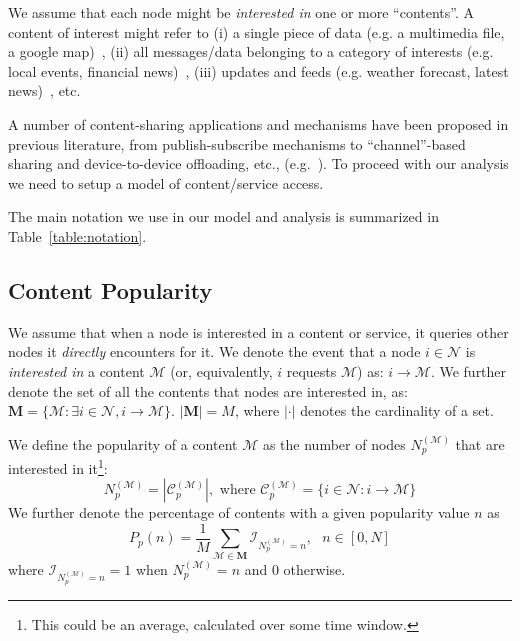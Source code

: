 \documentclass[journal]{IEEEtran}
\newcommand{\Np}{N_{p}^{(\mathcal{M})}}
\begin{document}
We assume that each node might be \textit{interested in} one or more ``contents''. A content of interest might refer to  (i) a single piece of data (e.g. a multimedia file, a google map)~\cite{offloading-wowmom11}, (ii) all messages/data belonging to a category of interests (e.g. local events, financial news)~\cite{Yoneki-publish-subscribe-dtn,Costa-publish-subscribe-dtn}, (iii) updates and feeds (e.g. weather forecast, latest news)~\cite{podcasting}, etc. 

A number of content-sharing applications and mechanisms have been proposed in previous literature, from publish-subscribe mechanisms to ``channel''-based sharing and device-to-device offloading, etc., (e.g.~\cite{Yoneki-publish-subscribe-dtn,MobComp-next-decade,Ott-oppnet-applications,podcasting}). To proceed with our analysis we need to setup a model of content/service access. 

The main notation we use in our model and analysis is summarized in Table~\ref{table:notation}.

\subsection*{\textbf{Content Popularity}}

We assume that when a node is interested in a content or service, it queries other nodes it \textit{directly} encounters for it.  We denote the event that a node $i\in\mathcal{N}$ is \textit{interested in} a content $\mathcal{M}$ (or, equivalently, $i$ requests $\mathcal{M}$) as: $i\rightarrow \mathcal{M}.$ We further denote the set of all the contents that nodes are interested in, as: $\textbf{M} = \lbrace \mathcal{M}: \exists i\in\mathcal{N}, i\rightarrow\mathcal{M} \rbrace$. $| \textbf{M} | = M$, where $|\cdot |$ denotes the cardinality of a set.
\begin{definition}\label{def:content-popularity}
We define the popularity of a content $\mathcal{M}$ as the number of nodes $\Np$ that are interested in it\footnote{This could be an average, calculated over some time window.}: 
\begin{equation}\label{eq:popularity-definition}
\Np =  |\mathcal{C}_{p}^{(\mathcal{M})}|, \text{ where } \mathcal{C}_{p}^{(\mathcal{M})} = \lbrace i\in \mathcal{N}: i\rightarrow\mathcal{M}\rbrace 
\end{equation}
We further denote the percentage of contents with a given popularity value $n$ as 
\begin{equation}\label{eq:popularity-distribution}
 P_{p}(n) = \frac{1}{M}\sum_{\mathcal{M}\in\textbf{M}}\mathcal{I}_{\Np=n},~~~ n\in[0,N]
\end{equation}
where $\mathcal{I}_{\Np=n}=1$ when $\Np=n$ and $0$ otherwise. 
\end{definition}
\end{document}
